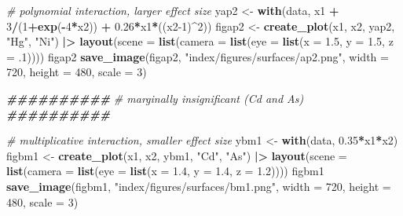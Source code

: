 \documentclass[12pt, twoside]{amherstthesis}
\newenvironment{Shaded}{\begin{snugshade}}{\end{snugshade}}
\newcommand{\AttributeTok}[1]{\textcolor[rgb]{0.13,0.29,0.53}{#1}}
\newcommand{\CommentTok}[1]{\textcolor[rgb]{0.56,0.35,0.01}{\textit{#1}}}
\newcommand{\DecValTok}[1]{\textcolor[rgb]{0.00,0.00,0.81}{#1}}
\newcommand{\DocumentationTok}[1]{\textcolor[rgb]{0.56,0.35,0.01}{\textbf{\textit{#1}}}}
\newcommand{\FloatTok}[1]{\textcolor[rgb]{0.00,0.00,0.81}{#1}}
\newcommand{\FunctionTok}[1]{\textcolor[rgb]{0.13,0.29,0.53}{\textbf{#1}}}
\newcommand{\NormalTok}[1]{#1}
\newcommand{\OtherTok}[1]{\textcolor[rgb]{0.56,0.35,0.01}{#1}}
\newcommand{\SpecialCharTok}[1]{\textcolor[rgb]{0.81,0.36,0.00}{\textbf{#1}}}
\newcommand{\StringTok}[1]{\textcolor[rgb]{0.31,0.60,0.02}{#1}}
\begin{document}
\begin{Shaded}
\begin{Highlighting}[]
\CommentTok{\# polynomial interaction, larger effect size}
\NormalTok{yap2 }\OtherTok{\textless{}{-}} \FunctionTok{with}\NormalTok{(data, x1 }\SpecialCharTok{+} \DecValTok{3}\SpecialCharTok{/}\NormalTok{(}\DecValTok{1}\SpecialCharTok{+}\FunctionTok{exp}\NormalTok{(}\SpecialCharTok{{-}}\DecValTok{4}\SpecialCharTok{*}\NormalTok{x2)) }\SpecialCharTok{+} \FloatTok{0.26}\SpecialCharTok{*}\NormalTok{x1}\SpecialCharTok{*}\NormalTok{((x2}\DecValTok{{-}1}\NormalTok{)}\SpecialCharTok{\^{}}\DecValTok{2}\NormalTok{))}
\NormalTok{figap2 }\OtherTok{\textless{}{-}} \FunctionTok{create\_plot}\NormalTok{(x1, x2, yap2, }\StringTok{"Hg"}\NormalTok{, }\StringTok{"Ni"}\NormalTok{) }\SpecialCharTok{|\textgreater{}} 
  \FunctionTok{layout}\NormalTok{(}\AttributeTok{scene =} \FunctionTok{list}\NormalTok{(}\AttributeTok{camera =} \FunctionTok{list}\NormalTok{(}\AttributeTok{eye =} \FunctionTok{list}\NormalTok{(}\AttributeTok{x =} \FloatTok{1.5}\NormalTok{, }\AttributeTok{y =} \FloatTok{1.5}\NormalTok{, }\AttributeTok{z =}\NormalTok{ .}\DecValTok{1}\NormalTok{))))}
\NormalTok{figap2}
\FunctionTok{save\_image}\NormalTok{(figap2, }\StringTok{"index/figures/surfaces/ap2.png"}\NormalTok{, }
           \AttributeTok{width =} \DecValTok{720}\NormalTok{, }\AttributeTok{height =} \DecValTok{480}\NormalTok{, }\AttributeTok{scale =} \DecValTok{3}\NormalTok{)}

\DocumentationTok{\#\#\#\#\#\#\#\#\#\#}
\CommentTok{\# marginally insignificant (Cd and As)}
\DocumentationTok{\#\#\#\#\#\#\#\#\#\#}

\CommentTok{\# multiplicative interaction, smaller effect size}
\NormalTok{ybm1 }\OtherTok{\textless{}{-}} \FunctionTok{with}\NormalTok{(data, }\FloatTok{0.35}\SpecialCharTok{*}\NormalTok{x1}\SpecialCharTok{*}\NormalTok{x2) }
\NormalTok{figbm1 }\OtherTok{\textless{}{-}} \FunctionTok{create\_plot}\NormalTok{(x1, x2, ybm1, }\StringTok{"Cd"}\NormalTok{, }\StringTok{"As"}\NormalTok{) }\SpecialCharTok{|\textgreater{}} 
  \FunctionTok{layout}\NormalTok{(}\AttributeTok{scene =} \FunctionTok{list}\NormalTok{(}\AttributeTok{camera =} \FunctionTok{list}\NormalTok{(}\AttributeTok{eye =} \FunctionTok{list}\NormalTok{(}\AttributeTok{x =} \FloatTok{1.4}\NormalTok{, }\AttributeTok{y =} \FloatTok{1.4}\NormalTok{, }\AttributeTok{z =} \FloatTok{1.2}\NormalTok{))))}
\NormalTok{figbm1}
\FunctionTok{save\_image}\NormalTok{(figbm1, }\StringTok{"index/figures/surfaces/bm1.png"}\NormalTok{, }
           \AttributeTok{width =} \DecValTok{720}\NormalTok{, }\AttributeTok{height =} \DecValTok{480}\NormalTok{, }\AttributeTok{scale =} \DecValTok{3}\NormalTok{)}


\end{Highlighting}
\end{Shaded}
\end{document}
